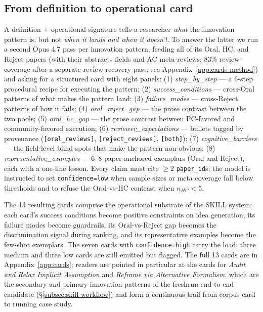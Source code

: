 \documentclass[10pt,a4paper]{article}
\begin{document}
\subsection{From definition to operational card}
\label{subsec:cards}

A definition + operational signature tells a researcher \emph{what} the innovation pattern is, but not \emph{when it lands and when it doesn't}. To answer the latter we run a second Opus 4.7 pass per innovation pattern, feeding all of its Oral, HC, and Reject papers (with their abstract$_*$ fields and AC meta-reviews; 83\% review coverage after a separate review-recovery pass; see Appendix~\ref{app:cards-method}) and asking for a structured card with eight panels: (1) \emph{step\_by\_step} --- a 6-step procedural recipe for executing the pattern; (2) \emph{success\_conditions} --- cross-Oral patterns of what makes the pattern land; (3) \emph{failure\_modes} --- cross-Reject patterns of how it fails; (4) \emph{oral\_reject\_gap} --- the prose contrast between the two pools; (5) \emph{oral\_hc\_gap} --- the prose contrast between PC-favored and community-favored execution; (6) \emph{reviewer\_expectations} --- bullets tagged by provenance (\texttt{[oral\_reviews]}, \texttt{[reject\_reviews]}, \texttt{[both]}); (7) \emph{cognitive\_barriers} --- the field-level blind spots that make the pattern non-obvious; (8) \emph{representative\_examples} --- 6--8 paper-anchored exemplars (Oral and Reject), each with a one-line lesson. Every claim must cite $\geq 2$ \texttt{paper\_id}s; the model is instructed to set \texttt{confidence=low} when sample sizes or meta coverage fall below thresholds and to refuse the Oral-vs-HC contrast when $n_{HC}<5$.

The 13 resulting cards comprise the operational substrate of the SKILL system: each card's success conditions become positive constraints on idea generation, its failure modes become guardrails, its Oral-vs-Reject gap becomes the discrimination signal during ranking, and its representative examples become the few-shot exemplars. The seven cards with \texttt{confidence=high} carry the load; three medium and three low cards are still emitted but flagged. The full 13 cards are in Appendix~\ref{app:cards}; readers are pointed in particular at the cards for \emph{Audit and Relax Implicit Assumption} and \emph{Reframe via Alternative Formalism}, which are the secondary and primary innovation patterns of the freshrun end-to-end candidate (\S\ref{subsec:skill-workflow}) and form a continuous trail from corpus card to running case study.
\end{document}
